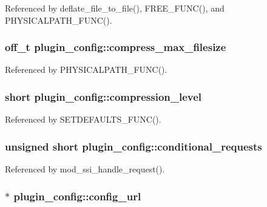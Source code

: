 Referenced by deflate\-\_\-file\-\_\-to\-\_\-file(), F\-R\-E\-E\-\_\-\-F\-U\-N\-C(), and P\-H\-Y\-S\-I\-C\-A\-L\-P\-A\-T\-H\-\_\-\-F\-U\-N\-C().

\hypertarget{structplugin__config_af5ebee1c843bd5f9c79bcda3abe37872}{
\subsubsection[{compress\-\_\-max\-\_\-filesize}]{\setlength{\rightskip}{0pt plus 5cm}off\-\_\-t plugin\-\_\-config\-::compress\-\_\-max\-\_\-filesize}}\label{structplugin__config_af5ebee1c843bd5f9c79bcda3abe37872}


Referenced by P\-H\-Y\-S\-I\-C\-A\-L\-P\-A\-T\-H\-\_\-\-F\-U\-N\-C().

\hypertarget{structplugin__config_a2600cca34919dfb16950767fa9a2a604}{
\subsubsection[{compression\-\_\-level}]{\setlength{\rightskip}{0pt plus 5cm}short plugin\-\_\-config\-::compression\-\_\-level}}\label{structplugin__config_a2600cca34919dfb16950767fa9a2a604}


Referenced by S\-E\-T\-D\-E\-F\-A\-U\-L\-T\-S\-\_\-\-F\-U\-N\-C().

\hypertarget{structplugin__config_af4193ae36d404442e5d63bed2281fc0f}{
\subsubsection[{conditional\-\_\-requests}]{\setlength{\rightskip}{0pt plus 5cm}unsigned short plugin\-\_\-config\-::conditional\-\_\-requests}}\label{structplugin__config_af4193ae36d404442e5d63bed2281fc0f}


Referenced by mod\-\_\-ssi\-\_\-handle\-\_\-request().

\hypertarget{structplugin__config_a72d94ba8d09b9d0c19d225f804783ea0}{
\subsubsection[{config\-\_\-url}]{$\ast$ plugin\-\_\-config\-::config\-\_\-url}}\label{structplugin__config_a72d94ba8d09b9d0c19d225f804783ea0}


